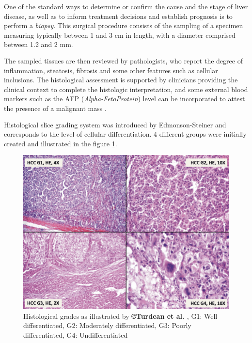 One of the standard ways to determine or confirm the cause and the stage
of liver disease, as well as to inform treatment decisions and establish
prognosis is to perform a \emph{biopsy}. This surgical procedure consists of the sampling of a specimen measuring typically between 1 and 3 cm in length, with a diameter comprised between 1.2 and 2 mm\cite{Bravo2001}.

The sampled tissues are then reviewed by pathologists, who report the
degree of inflammation, steatosis, fibrosis and some other features such
as cellular inclusions. The histological assessment is supported by
clinicians providing the clinical context to complete the histologic
interpretation, and some external blood markers such as the AFP
(\emph{Alpha-FetoProtein}) level can be incorporated to attest the presence of
a malignant mass \cite{Bai2017a, Heimbach2018}.

Histological slice grading system was introduced by Edmonson-Steiner and corresponds to the level of cellular differentiation. 4 different groups were initially created and illustrated in the figure \ref{HistologicalGrades}.

\begin{figure}[th!]
\centering
\includegraphics[width=0.7\linewidth]{images/image7}
\caption{Histological grades as illustrated by \textbf{©Turdean et al. \cite{Turdean2012}}, G1: Well differentiated, G2: Moderately differentiated, G3: Poorly differentiated, G4: Undifferentiated}
\label{HistologicalGrades}
\end{figure}

